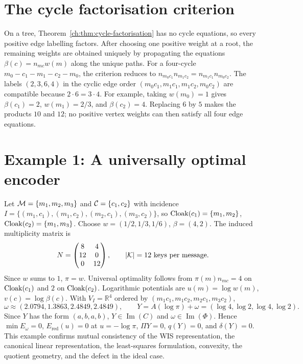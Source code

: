 \section{The cycle factorisation criterion}\label{ch:sec:the-cycle-factorisation-criterion}
On a tree, Theorem~\ref{ch:thm:cycle-factorisation} has no cycle equations,
so every positive edge labelling factors.  After choosing one positive
weight at a root, the remaining weights are obtained uniquely by
propagating the equations $\beta(c)=n_{mc}w(m)$ along the unique paths.
For a four-cycle
$m_0-c_1-m_1-c_2-m_0$, the criterion reduces to $n_{m_0c_1}n_{m_1c_2}=n_{m_1c_1}n_{m_0c_2}.$ The labels $(2,3,6,4)$ in the cyclic edge order
$(m_0c_1,m_1c_1,m_1c_2,m_0c_2)$ are compatible because
$2\cdot6=3\cdot4$.  For example, taking $w(m_0)=1$ gives
$\beta(c_1)=2$, $w(m_1)=2/3$, and $\beta(c_2)=4$.
Replacing $6$ by $5$ makes the products $10$ and $12$; no positive
vertex weights can then satisfy all four edge equations.
\section{Example 1: A universally optimal encoder}\label{ch:sec:example-1-a-universally-optimal-encoder}
Let $\mathcal{M}=\{m_1,m_2,m_3\}$ and $\mathcal{C}=\{c_1,c_2\}$ with incidence
$I=\{(m_1,c_1),(m_1,c_2),(m_2,c_1),(m_3,c_2)\}$, so
$\operatorname{Cloak}(c_1)=\{m_1,m_2\}$, $\operatorname{Cloak}(c_2)=\{m_1,m_3\}$.  Choose
$w=(1/2,1/3,1/6)$, $\beta=(4,2)$.  The induced multiplicity matrix is
\[
N=\begin{pmatrix}8&4\\12&0\\0&12\end{pmatrix},
\qquad |\mathcal{K}|=12\text{ keys per message}.
\]
Since $w$ sums to $1$, $\pi=w$.  Universal optimality follows from
$\pi(m)n_{mc}=4$ on $\operatorname{Cloak}(c_1)$ and $2$ on $\operatorname{Cloak}(c_2)$.
Logarithmic potentials are $u(m)=\log w(m)$, $v(c)=\log\beta(c)$.
With $V_I=\mathbb R^4$ ordered by $(m_1c_1,m_1c_2,m_2c_1,m_3c_2)$,
\[
\omega \approx (2.0794,1.3863,2.4849,2.4849),\qquad
Y = A(\log\pi)+\omega = (\log4,\log2,\log4,\log2).
\]
Since $Y$ has the form $(a,b,a,b)$, $Y\in\operatorname{Im}(C)$ and
$\omega\in\operatorname{Im}(\Phi)$.  Hence $\min E_\omega=0$,
$E_{\mathrm{red}}(u)=0$ at $u=-\log\pi$, $\Pi Y=0$, $q(Y)=0$, and
$\delta(Y)=0$.
This example confirms mutual consistency of the WIS representation, the
canonical linear representation, the least-squares formulation,
convexity, the quotient geometry, and the defect in the ideal case.
